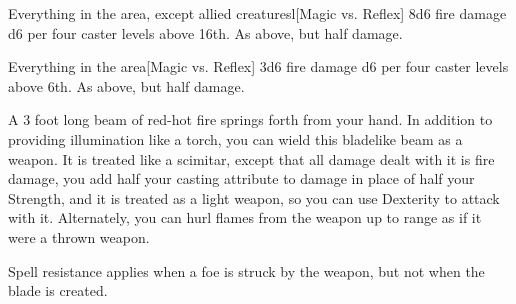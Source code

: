 \begin{spellheader}
\end{spellheader}
\begin{spelleffects}
    \begin{spelltargets}{Everything in the area, except allied creatures}l[Magic vs. Reflex]
        \spellsuccess 8d6 fire damage \add d6 per four caster levels above 16th.
        \spellfailure As above, but half damage.
    \end{spelltargets}
\end{spelleffects}

\begin{spellheader}
\end{spellheader}
\begin{spelleffects}
    \begin{spelltargets}{Everything in the area}[Magic vs. Reflex]
        \spellsuccess 3d6 fire damage \add d6 per four caster levels above 6th.
        \spellfailure As above, but half damage.
    \end{spelltargets}
\end{spelleffects}
\begin{spellfooter}
    \spellnotes \destructivespellnotes

    \firespellnotes
\end{spellfooter}

\begin{spellheader}
\end{spellheader}
\begin{spelleffects}
    \spelldur{\durlong \dismissable}
    \spelleffect A 3 foot long beam of red-hot fire springs forth from your hand. In addition to providing illumination like a torch, you can wield this bladelike beam as a weapon. It is treated like a scimitar, except that all damage dealt with it is fire damage, you add half your casting attribute to damage in place of half your Strength, and it is treated as a light weapon, so you can use Dexterity to attack with it. Alternately, you can hurl flames from the weapon up to \rngmed range as if it were a thrown weapon.
    \spellnotes \firespellnotes

    Spell resistance applies when a foe is struck by the weapon, but not when the blade is created.
\end{spelleffects}


